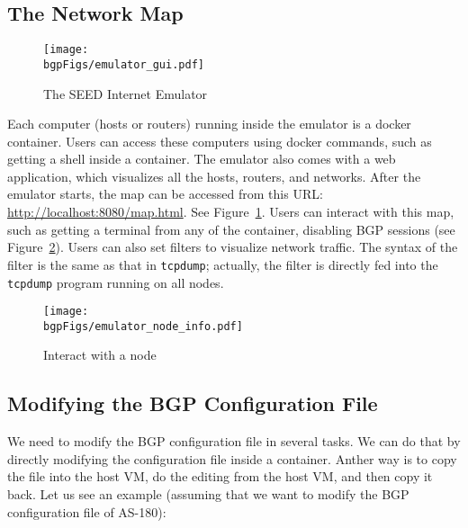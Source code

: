 \subsection{The Network Map}

\begin{figure}[htb]
  \begin{center}
    \texttt{[image: \\bgpFigs/emulator\_gui.pdf]}
  \end{center}
  \caption{The SEED Internet Emulator}
  \label{bgp:fig:emulator-map}
\end{figure}
 

Each computer (hosts or routers) running inside the emulator is a docker container.
Users can access these computers using docker commands, such as getting a shell
inside a container.
The emulator also comes with a web application, which visualizes all the hosts, routers,
and networks.
After the emulator starts, the map can be accessed from this
URL: \url{http://localhost:8080/map.html}.
See Figure~\ref{bgp:fig:emulator-map}.
Users can interact with this map, such as getting a terminal from any of the container,
disabling BGP sessions (see Figure~\ref{bgp:fig:node-info}). 
Users can also set filters to visualize network traffic.
The syntax of the filter is the same as that in \texttt{tcpdump}; actually,
the filter is directly fed into the \texttt{tcpdump} program running on all nodes.


\begin{figure}[htb]
  \begin{center}
    \texttt{[image: \\bgpFigs/emulator\_node\_info.pdf]}
  \end{center}
  \caption{Interact with a node}
  \label{bgp:fig:node-info}
\end{figure}
 

\subsection{Modifying the BGP Configuration File} 

We need to modify the BGP configuration file in several tasks.
We can do that by directly modifying the configuration file
inside a container. Anther way is to copy the file into the host VM,
do the editing from the host VM, and then copy it back. Let us 
see an example (assuming that we want to modify the BGP configuration
file of AS-180):

